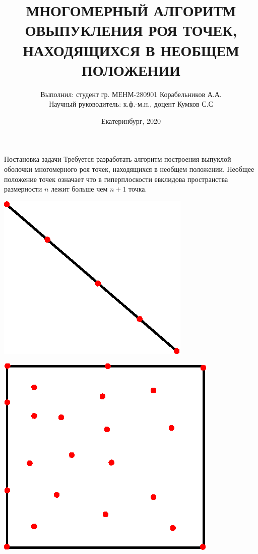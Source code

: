 \documentclass[]{beamer} %
\begin{document}
\title{МНОГОМЕРНЫЙ АЛГОРИТМ ОВЫПУКЛЕНИЯ РОЯ ТОЧЕК, НАХОДЯЩИХСЯ В НЕОБЩЕМ ПОЛОЖЕНИИ}
\author[Корабельников А.А.]{\scriptsize Выполнил: студент гр. МЕНМ-280901 Корабельников А.А.\\Научный руководитель: к.ф.-м.н., доцент Кумков С.С}
\date{Екатеринбург, 2020}
\frame{\titlepage}
\begin{frame}{Постановка задачи}
   Требуется разработать алгоритм построения выпуклой оболочки многомерного роя точек, находящихся в необщем положении.
   \vfill
   Необщее положение точек означает что в гиперплоскости евклидова пространства размерности $n$ лежит больше чем $n+1$ точка.\\
   \vfill
    \begin{minipage}{.49\textwidth}
    \centering
    \includegraphics[width=0.5\linewidth]{line.eps}
  \end{minipage}
  \begin{minipage}{.49\textwidth}
    \centering
    \includegraphics[width=0.5\linewidth]{cube1.eps}
  \end{minipage}
\end{frame}
\end{document}
